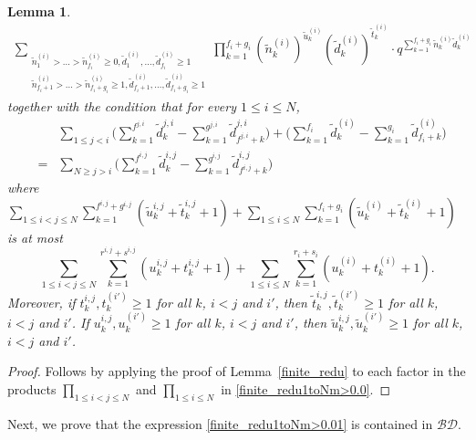 \documentclass[12pt, reqno]{amsart}
\newtheorem{lemma}[theorem]{Lemma}
\theoremstyle{definition}
\theoremstyle{remark}
\numberwithin{equation}{section}
\newcommand{\BD}{\mathcal {BD}}
\newcommand{\w}{\tilde}
\numberwithin{equation}{section}
\begin{document}
\begin{lemma}
\begin{eqnarray}
\sum_{\substack{\w n_1^{(i)} > \ldots > \w n_{f_i}^{(i)} \ge 0, 
    \w d_1^{(i)}, \ldots, \w d_{f_i}^{(i)} \ge 1\\
    \w n_{f_i+1}^{(i)} > \ldots > \w n_{f_i+g_i}^{(i)} \ge 1,
    \w d_{f_i+1}^{(i)}, \ldots, \w d_{f_i+g_i}^{(i)} \ge 1}}
  \prod_{k=1}^{f_i+g_i} (\w n_k^{(i)})^{\w u_k^{(i)}} 
    (\w d_k^{(i)})^{\w t_k^{(i)}}
\cdot q^{\sum_{k=1}^{f_i+g_i} \w n_k^{(i)} \w d_k^{(i)}}
\end{eqnarray}
together with the condition that for every $1 \le i \le N$,
\begin{eqnarray*}
& &\sum_{1 \le j < i} \bigg (\sum_{k=1}^{f^{j,i}} \w d_k^{j,i} 
    - \sum_{k=1}^{g^{j,i}} \w d_{f^{j,i}+k}^{j,i} \bigg )   
   + \bigg (\sum_{k=1}^{f_i} \w d_k^{(i)} 
    - \sum_{k=1}^{g_i} \w d_{f_i+k}^{(i)} \bigg )   \\
&=&\sum_{N \ge j > i} \bigg (\sum_{k=1}^{f^{i,j}} \w d_k^{i,j} 
    - \sum_{k=1}^{g^{i,j}} \w d_{f^{i,j}+k}^{i,j} \bigg )
\end{eqnarray*}
where $\displaystyle{\sum_{1 \le i < j \le N} \sum_{k=1}^{f^{i,j}+g^{i,j}} 
(\w u_k^{i,j} + \w t_k^{i,j} + 1) 
+ \sum_{1 \le i \le N} \sum_{k=1}^{f_i+g_i} 
(\w u_k^{(i)} + \w t_k^{(i)} +1)}$ is at most
$$
\sum_{1 \le i < j \le N} \sum_{k=1}^{r^{i,j}+s^{i,j}} 
(u_k^{i,j} + t_k^{i,j} + 1) 
+ \sum_{1 \le i \le N} \sum_{k=1}^{r_i+s_i} (u_k^{(i)} +t_k^{(i)} +1).
$$ 
Moreover, if $t_k^{i,j}, t_k^{(i')} \ge 1$ for all $k$, $i < j$ and $i'$, 
then $\w t_k^{i,j}, \w t_k^{(i')} \ge 1$ for all $k$, $i < j$ and $i'$. 
If $u_k^{i,j}, u_k^{(i')} \ge 1$ for all $k$, $i < j$ and $i'$, 
then $\w u_k^{i,j}, \w u_k^{(i')} \ge 1$ for all $k$, $i < j$ and $i'$.
\end{lemma}
\begin{proof}
Follows by applying the proof of Lemma~\ref{finite_redu} to 
each factor in the products $\prod_{1 \le i < j \le N}$ and 
$\prod_{1 \le i \le N}$ in \eqref{finite_redu1toNm>0.0}.
\end{proof}

Next, we prove that the expression \eqref{finite_redu1toNm>0.01} 
is contained in $\BD$.
\end{document}
